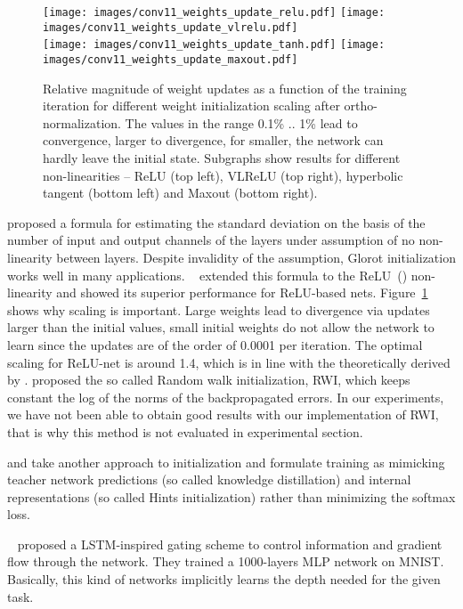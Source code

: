 \documentclass{article} \clearpage{}\usepackage{iclr2016_conference,times}
\begin{document}
\begin{figure}[tb]
\centering
\texttt{[image: images/conv11\_weights\_update\_relu.pdf]}
\texttt{[image: images/conv11\_weights\_update\_vlrelu.pdf]}\\
\texttt{[image: images/conv11\_weights\_update\_tanh.pdf]}
\texttt{[image: images/conv11\_weights\_update\_maxout.pdf]}
\caption{Relative magnitude of weight updates as a function of the training iteration for different weight initialization scaling after ortho-normalization. The values in the range 0.1\% .. 1\% lead to convergence, larger to divergence, for smaller, the network  can hardly leave  the initial state. Subgraphs show results for different non-linearities -- ReLU (top left), VLReLU (top right), hyperbolic tangent (bottom left) and Maxout (bottom right).}
\label{fig:weights-scaling}
\end{figure}

\cite{Xavier10} proposed a formula for estimating the standard deviation on the basis of the number of input and output channels of the layers under assumption of no non-linearity between layers. Despite invalidity of the  assumption, Glorot initialization works well in many applications. 
~\cite{MSRA2015} extended this formula to the ReLU~(\cite{ReLU2011}) non-linearity and showed its superior performance for ReLU-based nets. 
Figure~\ref{fig:weights-scaling} shows why scaling is important. Large weights lead to divergence via updates larger than the initial values, small initial weights do not allow the network to learn since the updates are of the order of 0.0001 per iteration. The optimal scaling for ReLU-net is around 1.4, which is in line with the theoretically derived  by \cite{MSRA2015}. 
\cite{Sussillo2014}  proposed the so called Random walk initialization, RWI, which keeps constant the log of the norms of the backpropagated errors. In our experiments, we have not been able to obtain good results with our implementation of RWI, that is why this method is not evaluated in experimental section.

\cite{KDHinton2015} and \cite{FitNets2014} take another approach to initialization and formulate training as mimicking teacher network predictions (so called knowledge distillation) and internal representations (so called Hints initialization) rather than minimizing the softmax loss.

~\cite{Highway2015} proposed a LSTM-inspired gating scheme to control information and gradient flow through the network. They trained a 1000-layers MLP network on MNIST. Basically, this kind of networks implicitly learns the depth needed for the 
given task. 
\end{document}
